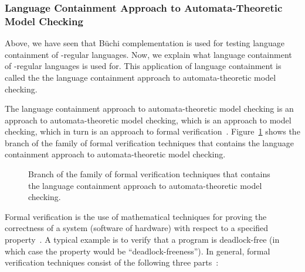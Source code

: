 



\subsubsection{Language Containment Approach to Automata-Theoretic Model Checking}
Above, we have seen that Büchi complementation is used for testing language containment of \om-regular languages. Now, we explain what language containment of \om-regular languages is used for. This application of language containment is called the the language containment approach to automata-theoretic model checking.

The language containment approach to automata-theoretic model checking is an approach to automata-theoretic model checking, which is an approach to model checking, which in turn is an approach to formal verification~\cite{2007_vardi_model_checking}. Figure~\ref{model_checking} shows the branch of the family of formal verification techniques that contains the language containment approach to automata-theoretic model checking.

\begin{figure}[htb]
\centering
\ModelChecking
\caption{Branch of the family of formal verification techniques that contains the language containment approach to automata-theoretic model checking.}
\label{model_checking}
\end{figure}

Formal verification is the use of mathematical techniques for proving the correctness of a system (software of hardware) with respect to a specified property~\cite{2007_vardi_model_checking}. A typical example is to verify that a program is deadlock-free (in which case the property would be ``deadlock-freeness''). In general, formal verification techniques consist of the following three parts~\cite{huth2004logic}:

